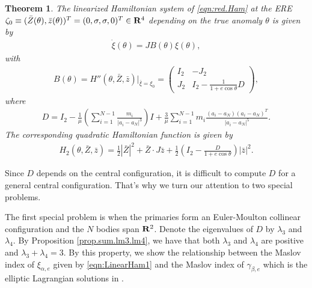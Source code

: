 \documentclass[11pt]{article}
\newtheorem{theorem}[lemma]{Theorem}
\def\bea{\begin{eqnarray}}
\def\eea{\end{eqnarray}}
\def\lb{\label}
\def\R{{\bf R}}
\def\aa{{\alpha}}
\def\ga{{\gamma}}
\def\th{{\theta}}
\def\lm{{\lambda}}
\begin{document}
\begin{theorem}\label{linearized.Hamiltonian}
The linearized Hamiltonian system of \eqref{eqn:red.Ham}  at the ERE
  $\zeta_0 \equiv (\bar{Z}(\theta),\bar{z}(\theta))^T =
  (0,\sigma,\sigma,0)^T\in\R^4  $
  depending on the true anomaly $\theta$ is given by
  \begin{align}
    \dot\xi(\theta) = JB(\theta)\xi(\theta),  \lb{eqn:LinearHam1}
  \end{align}
  with
  \bea B(\theta)
  = H''(\theta,\bar{Z},\bar{z})|_{\bar\xi=\xi_0}
  = \left(\begin{array}{cccc|cccc}
  I_2   &-J_2 \\
  J_2     &I_2-\frac{1}{1+e\cos\th}D
  \end{array}\right),  \lb{LinearHam2}\eea
  where
  \begin{align}
    \label{matrix.D}
  D=I_2-\frac{1}{\mu}\left(\sum_{i=1}^{N-1}
  \frac{m_i}{|a_i-a_{N}|^3}\right)I
  +\frac{3}{\mu}\sum_{i=1}^{N-1} m_i\frac{(a_i-a_{N})(a_i-a_{N})^T}{|a_i-a_{N}|^5}.
  \end{align}
  The corresponding quadratic Hamiltonian function is given by
  \bea
  H_2(\theta,\bar{Z},\bar{z})  
   =\frac{1}{2}|\bar{Z}|^2+\bar{Z}\cdot J\bar{z}
    +\frac{1}{2}\left(I_2-\frac{D}{1+e\cos\th}\right)|\bar{z}|^2. \eea
  \end{theorem}

Since $D$ depends on the central configuration,
it is difficult to compute $D$ for a general central configuration.
That's why we turn our attention to two special problems.
  
The first special problem is when the primaries form an Euler-Moulton collinear configuration and the $N$ bodies span $\R^2$.
Denote the eigenvalues of $D$ by $\lm_3$ and $\lm_4$. By Proposition  \ref{prop.sum.lm3.lm4}, we have that both $\lm_3$ and $\lm_4$ are positive and  $\lm_3 + \lm_4 = 3$.
By this property, we show the relationship between the Maslov index of $\xi_{\aa, e}$ given by \eqref{eqn:LinearHam1} and the Maslov index of $\ga_{\beta, e}$ which is the elliptic Lagrangian solutions in \cite{HLS}. 
\end{document}
